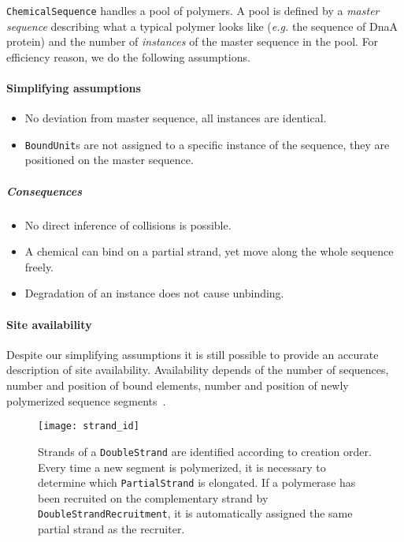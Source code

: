 \texttt{ChemicalSequence} handles a pool of polymers. A pool is defined by a \emph{master sequence} describing what a typical polymer looks like (\textit{e.g.} the sequence of DnaA protein) and the number of \emph{instances} of the master sequence in the pool. For efficiency reason, we do the following assumptions.

\paragraph{Simplifying assumptions}
\begin{itemize}
\item No deviation from master sequence, all instances are identical.
\item \texttt{BoundUnit}s are not assigned to a specific instance of the sequence, they are positioned on the  master sequence.
\end{itemize}

\subparagraph{Consequences}
\begin{itemize}
\item No direct inference of collisions is possible.
\item A chemical can bind on a partial strand, yet move along the whole sequence freely.
\item Degradation of an instance does not cause unbinding.
\end{itemize}

\paragraph{Site availability}
Despite our simplifying assumptions it is still possible to provide an accurate description of site availability. Availability depends of the number of sequences, number and position of bound elements, number and position of newly polymerized sequence segments~.


\begin{figure}[!h]
  \centering
  \texttt{[image: strand\_id]}
  \caption{Strands of a \texttt{DoubleStrand} are identified according to creation order. Every time a new segment is polymerized, it is necessary to determine which \texttt{PartialStrand} is elongated. If a polymerase has been recruited on the complementary strand by \texttt{DoubleStrandRecruitment}, it is automatically assigned the same partial strand as the recruiter.}
  \label{fig:strand_id}
\end{figure}

